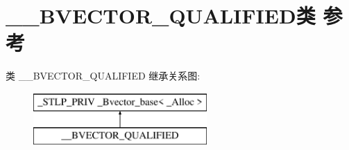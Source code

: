 \hypertarget{class_____b_v_e_c_t_o_r___q_u_a_l_i_f_i_e_d}{}\section{\+\_\+\+\_\+\+B\+V\+E\+C\+T\+O\+R\+\_\+\+Q\+U\+A\+L\+I\+F\+I\+E\+D类 参考}
\label{class_____b_v_e_c_t_o_r___q_u_a_l_i_f_i_e_d}
类 \+\_\+\+\_\+\+B\+V\+E\+C\+T\+O\+R\+\_\+\+Q\+U\+A\+L\+I\+F\+I\+ED 继承关系图\+:\begin{figure}[H]
\begin{center}
\leavevmode
\includegraphics[height=2.000000cm]{class_____b_v_e_c_t_o_r___q_u_a_l_i_f_i_e_d}
\end{center}
\end{figure}

